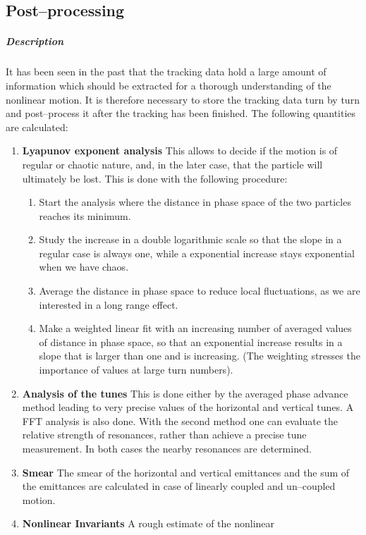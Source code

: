 \documentclass[a4paper,11pt]{report}
\begin{document}
\subsection{Post--processing} \label{PosPro}

\subparagraph{Description} It has been seen in the past that the
tracking data hold a large amount of information which should be
extracted for a thorough understanding of the nonlinear motion. It is
therefore necessary to store the tracking data turn by turn and
post--process it after the tracking has been finished. The following
quantities are calculated:
\begin{enumerate}
\item {\bf Lyapunov exponent analysis} This allows to decide if the
  motion is of regular or chaotic nature, and, in the later case, that
  the particle will ultimately be lost.  This is done with the
  following procedure:
 \begin{enumerate}
 \item Start the analysis where the distance in phase space of the two
   particles reaches its minimum.
 \item Study the increase in a double logarithmic scale so that the
   slope in a regular case is always one, while a exponential increase
   stays exponential when we have chaos.
 \item Average the distance in phase space to reduce local
   fluctuations, as we are interested in a long range effect.
 \item Make a weighted linear fit with an increasing number of
   averaged values of distance in phase space, so that an exponential
   increase results in a slope that is larger than one and is
   increasing. (The weighting stresses the importance of values at
   large turn numbers).
 \end{enumerate}
\item {\bf Analysis of the tunes} This is done either by the averaged
  phase advance method leading to very precise values of the
  horizontal and vertical tunes. A FFT analysis is also done.  With
  the second method one can evaluate the relative strength of
  resonances, rather than achieve a precise tune measurement. In both
  cases the nearby resonances are determined.
\item {\bf Smear} The smear of the horizontal and vertical emittances
  and the sum of the emittances are calculated in case of linearly
  coupled and un--coupled motion.
\item {\bf Nonlinear Invariants} A rough estimate of the nonlinear

\end{enumerate}
\end{document}

